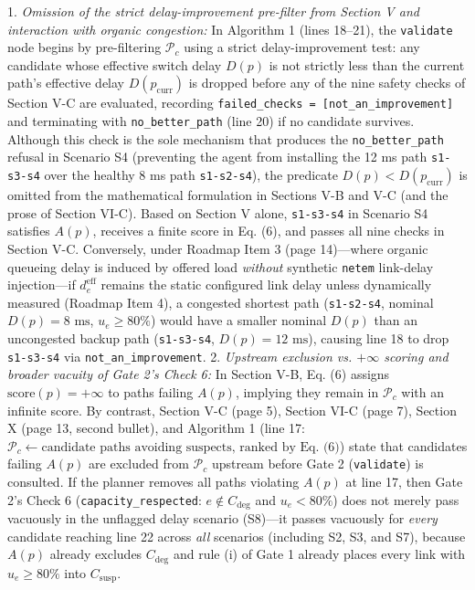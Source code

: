 \documentclass[11pt,a4paper]{article}
\begin{document}
1. \emph{Omission of the strict delay-improvement pre-filter from Section V and interaction with organic congestion:} In Algorithm 1 (lines 18–21), the \texttt{validate} node begins by pre-filtering $\mathcal{P}_c$ using a strict delay-improvement test: any candidate whose effective switch delay $D(p)$ is not strictly less than the current path's effective delay $D(p_{\text{curr}})$ is dropped before any of the nine safety checks of Section V-C are evaluated, recording \texttt{failed\_checks = [not\_an\_improvement]} and terminating with \texttt{no\_better\_path} (line 20) if no candidate survives. Although this check is the sole mechanism that produces the \texttt{no\_better\_path} refusal in Scenario S4 (preventing the agent from installing the 12 ms path \texttt{s1-s3-s4} over the healthy 8 ms path \texttt{s1-s2-s4}), the predicate $D(p) < D(p_{\text{curr}})$ is omitted from the mathematical formulation in Sections V-B and V-C (and the prose of Section VI-C). Based on Section V alone, \texttt{s1-s3-s4} in Scenario S4 satisfies $A(p)$, receives a finite score in Eq. (6), and passes all nine checks in Section V-C. Conversely, under Roadmap Item 3 (page 14)—where organic queueing delay is induced by offered load \emph{without} synthetic \texttt{netem} link-delay injection—if $d_e^{\text{eff}}$ remains the static configured link delay unless dynamically measured (Roadmap Item 4), a congested shortest path (\texttt{s1-s2-s4}, nominal $D(p) = 8\text{ ms}$, $u_e \ge 80\%$) would have a smaller nominal $D(p)$ than an uncongested backup path (\texttt{s1-s3-s4}, $D(p) = 12\text{ ms}$), causing line 18 to drop \texttt{s1-s3-s4} via \texttt{not\_an\_improvement}.
2. \emph{Upstream exclusion vs. $+\infty$ scoring and broader vacuity of Gate 2's Check 6:} In Section V-B, Eq. (6) assigns $\text{score}(p) = +\infty$ to paths failing $A(p)$, implying they remain in $\mathcal{P}_c$ with an infinite score. By contrast, Section V-C (page 5), Section VI-C (page 7), Section X (page 13, second bullet), and Algorithm 1 (line 17: $\mathcal{P}_c \leftarrow \text{candidate paths avoiding suspects, ranked by Eq. (6)}$) state that candidates failing $A(p)$ are excluded from $\mathcal{P}_c$ upstream before Gate 2 (\texttt{validate}) is consulted. If the planner removes all paths violating $A(p)$ at line 17, then Gate 2's Check 6 (\texttt{capacity\_respected}: $e \notin C_{\text{deg}}$ and $u_e < 80\%$) does not merely pass vacuously in the unflagged delay scenario (S8)—it passes vacuously for \emph{every} candidate reaching line 22 across \emph{all} scenarios (including S2, S3, and S7), because $A(p)$ already excludes $C_{\text{deg}}$ and rule (i) of Gate 1 already places every link with $u_e \ge 80\%$ into $C_{\text{susp}}$.
\end{document}
